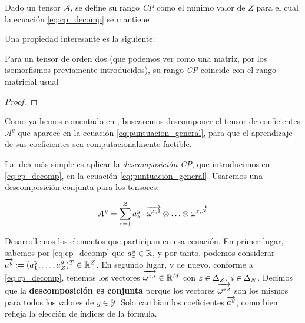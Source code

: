 \begin{definicion}
    Dado un tensor $\mathcal{A}$, se define su rango \textit{CP} como el mínimo valor de $Z$ para el cual la ecuación \eqref{eq:cp_decomp} se mantiene
\end{definicion}

Una propiedad interesante es la siguiente:

\begin{proposicion}[]
    Para un tensor de orden dos (que podemos ver como una matriz, por los isomorfismos previamente introducidos), su rango \textit{CP} coincide con el rango matricial usual
\end{proposicion}

\begin{proof}


\end{proof}



Como ya hemos comentado en , buscaremos descomponer el tensor de coeficientes $\mathcal{A}^y$ que aparece en la ecuación \eqref{eq:puntuacion_general}, para que el aprendizaje de sus coeficientes sea computacionalmente factible.

La idea más simple es aplicar la \textit{descomposición CP}, que introducimos en \eqref{eq:cp_decomp}, en la ecuación \eqref{eq:puntuacion_general}. Usaremos una descomposición conjunta para los tensores:

\begin{equation} \label{eq:cp_decomp_conjunta}
    \mathcal{A}^y = \sum_{z = 1}^Z a_z^y \cdot \overrightarrow{\omega^{z, 1}} \otimes \ldots \otimes \overrightarrow{\omega^{z, N}}
\end{equation}


Desarrollemos los elementos que participan en esa ecuación. En primer lugar, sabemos por \eqref{eq:cp_decomp} que $a_z^y \in \mathbb{R}$, y por tanto, podemos considerar $\overrightarrow{a^y} := (a_1^y, \ldots, a_Z^y)^T \in \mathbb{R}^Z$. En segundo lugar, y de nuevo, conforme a \eqref{eq:cp_decomp}, tenemos los vectores $\overrightarrow{\omega^{z, i}} \in \mathbb{R}^M$ con $z \in \Delta_{Z}$, $i \in \Delta_{N}$. Decimos que la \textbf{descomposición es conjunta} porque los vectores $\overrightarrow{\omega^{z, i}}$ son los mismos para todos los valores de $y \in \mathcal{Y}$. Solo cambian los coeficientes $\overrightarrow{a^y}$, como bien refleja la elección de índices de la fórmula.

